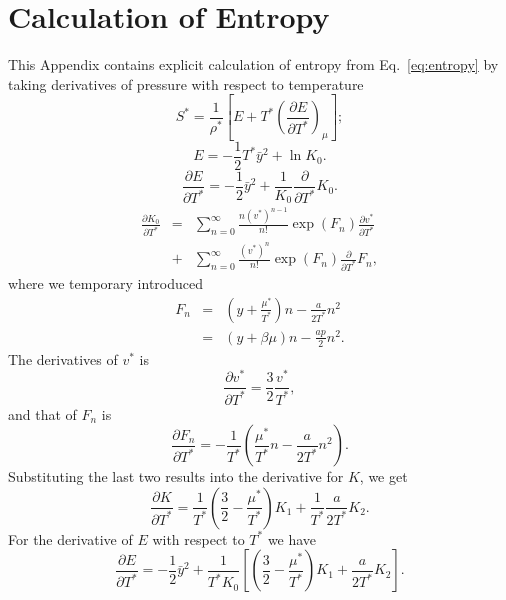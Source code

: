 \documentclass[12pt]{article}
\numberwithin{equation}{section}
\begin{document}
	\section{\label{sec:app:entropy} Calculation of Entropy}
	This Appendix contains explicit calculation of entropy from Eq.~\eqref{eq:entropy} by taking derivatives of pressure with respect to temperature
	\begin{equation}
		S^{*} = \frac{1}{\rho^*} \left[E + T^* \left(\frac{\partial E}{\partial T^*}\right)_{\mu}\right];
	\end{equation}
	\begin{equation}
		E = -\frac{1}{2}T^* \bar{y}^2 + \ln K_0.
	\end{equation}
	\begin{equation}
		\frac{\partial E}{\partial T^*} = -\frac{1}{2}\bar{y}^2 + \frac{1}{K_0}\frac{\partial}{\partial T^*} K_0.
	\end{equation}
	\begin{eqnarray}
		\frac{\partial K_0}{\partial T^*} & = & \sum_{n=0}^{\infty} \frac{n (v^*)^{n-1}}{n!} \exp(F_n) \frac{\partial v^*}{\partial T^*} 
		\nonumber\\
		& + & \sum_{n=0}^{\infty} \frac{(v^*)^n}{n!} \exp(F_n) \frac{\partial}{\partial T^*} F_n,
	\end{eqnarray}
	where we temporary introduced
	\begin{eqnarray*}
		F_n & = & \left(y + \frac{\mu^*}{T^*} \right)n -\frac{a}{2T^*}n^2
		\\
		& = & \left(y + \beta\mu \right)n -\frac{ap}{2}n^2.
	\end{eqnarray*}
	The derivatives of $v^*$ is
	\begin{equation}
		\frac{\partial v^*}{\partial T^*} = \frac{3}{2} \frac{v^*}{T^*},
	\end{equation}
	and that of $F_n$ is
	\begin{equation}
		\frac{\partial F_n}{\partial T^*} = -\frac{1}{T^*} \left(\frac{\mu^*}{T^*}n - \frac{a}{2T^*}n^2\right).
	\end{equation}
	Substituting the last two results into the derivative for $K$, we get
	\begin{equation}
		\frac{\partial K}{\partial T^*} = \frac{1}{T^*} \left(\frac{3}{2} - \frac{\mu^*}{T^*} \right)K_1 + \frac{1}{T^*}\frac{a}{2 T^*} K_2.
	\end{equation}
	For the derivative of $E$ with respect to $T^*$ we have
	\begin{equation}
		\frac{\partial E}{\partial T^*} = -\frac{1}{2}\bar{y}^2 + \frac{1}{T^* K_0} \left[\left(\frac{3}{2} - \frac{\mu^*}{T^*} \right)K_1 + \frac{a}{2 T^*} K_2\right].
	\end{equation}
\end{document}
